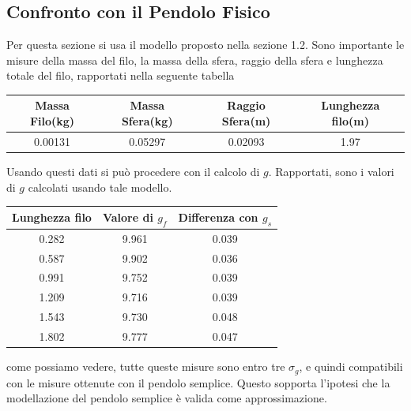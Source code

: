 \documentclass[a4paper]{article}
\begin{document}
\subsection{Confronto con il Pendolo Fisico}
Per questa sezione si usa il modello proposto nella sezione 1.2. Sono importante le misure della massa del filo, la massa della sfera, raggio della sfera e lunghezza totale del filo, rapportati nella seguente tabella

\begin{center}
    \begin{tabular}{|c|c|c|c|}
    \hline
    Massa Filo(kg)&Massa Sfera(kg)&Raggio Sfera(m) & Lunghezza filo(m)\\
    \hline
    0.00131 & 0.05297 & 0.02093 & 1.97 \\

    \hline
    \end{tabular}
\end{center}
Usando questi dati si può procedere con il calcolo di $g$. Rapportati, sono i valori di $g$ calcolati usando tale modello. 
\begin{center}
    \begin{tabular}{|c|c|c|}
    \hline
    Lunghezza filo & Valore di $g_f$ & Differenza con $g_s$\\
    \hline
    0.282 & 9.961 & 0.039\\
    0.587 & 9.902 & 0.036\\
    0.991 & 9.752 & 0.039\\
    1.209 & 9.716 & 0.039\\
    1.543 & 9.730 & 0.048\\
    1.802 & 9.777 & 0.047\\
    \hline
    \end{tabular}
\end{center}
come possiamo vedere, tutte queste misure sono entro tre $\sigma_g$, e quindi compatibili con le misure ottenute con il pendolo semplice. Questo sopporta l'ipotesi che la modellazione del pendolo semplice è valida come approssimazione.
\end{document}
